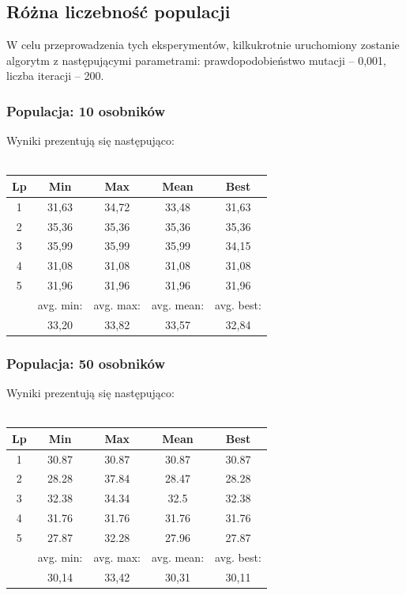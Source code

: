 \documentclass[a4paper,11pt]{article}
\begin{document}
		\subsection{Różna liczebność populacji}
			W celu przeprowadzenia tych eksperymentów, kilkukrotnie uruchomiony zostanie algorytm z następującymi parametrami: prawdopodobieństwo mutacji -- 0,001, liczba iteracji -- 200.
			\subsubsection{Populacja: 10 osobników}
				Wyniki prezentują się następująco:\\~\\
				\begin{tabular}{|c|c|c|c|c|}
					\hline 
					Lp & Min & Max & Mean & Best \\
					\hline
					1 & 31,63  & 34,72 & 33,48 & 31,63\\\hline
					2 & 35,36 & 35,36  &35,36 & 35,36 \\\hline
					3 & 35,99 & 35,99  & 35,99 &34,15 \\\hline
					4 & 31,08 & 31,08  & 31,08& 31,08 \\\hline
					5 & 31,96 & 31,96  & 31,96 & 31,96\\\hline
					&avg. min:&avg. max:&avg. mean:&avg. best:\\\hline
					& 33,20 & 33,82& 33,57 &32,84\\\hline
				\end{tabular} 
				

			\subsubsection{Populacja: 50 osobników}
				Wyniki prezentują się następująco:\\~\\
				\begin{tabular}{|c|c|c|c|c|}
					\hline 
					Lp & Min & Max & Mean & Best \\
					\hline
					1 & 30.87 & 30.87 & 30.87 & 30.87 \\\hline
					2 & 28.28 & 37.84 & 28.47 & 28.28 \\\hline
					3 & 32.38 & 34.34 & 32.5 & 32.38 \\\hline
					4 & 31.76 & 31.76 & 31.76 & 31.76 \\\hline
					5 & 27.87 & 32.28 & 27.96 & 27.87 \\\hline
					&avg. min:&avg. max:&avg. mean:&avg. best:\\\hline
					& 30,14 & 33,42 & 30,31  & 30,11\\\hline
				\end{tabular} 
\end{document}
